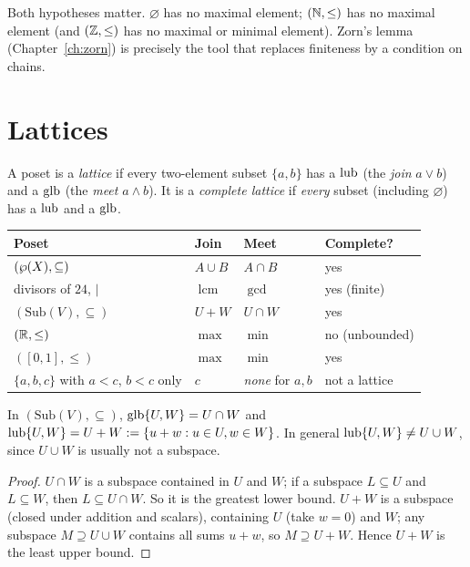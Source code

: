 \begin{remark}
	Both hypotheses matter. $\varnothing$ has no maximal element; $(\mathbb{N},\le)$ has no maximal element (and $(\mathbb{Z},\le)$ has no maximal or minimal element). Zorn's lemma (Chapter~\ref{ch:zorn}) is precisely the tool that replaces finiteness by a condition on chains.
\end{remark}

\section{Lattices}

\begin{definition}[Lattice]
	A poset is a \emph{lattice} if every two-element subset $\{a,b\}$ has a $\operatorname{lub}$ (the \emph{join} $a\vee b$) and a $\operatorname{glb}$ (the \emph{meet} $a\wedge b$). It is a \emph{complete lattice} if \emph{every} subset (including $\varnothing$) has a $\operatorname{lub}$ and a $\operatorname{glb}$.
\end{definition}

\begin{center}
	\begin{tabular}{@{}p{4.6cm}p{2.9cm}p{2.9cm}p{3.6cm}@{}}
		\toprule
		\textbf{Poset} & \textbf{Join} & \textbf{Meet} & \textbf{Complete?}\\
		\midrule
		$(\wp(X),\subseteq)$ & $A\cup B$ & $A\cap B$ & yes\\
		divisors of $24$, $\mid$ & $\operatorname{lcm}$ & $\gcd$ & yes (finite)\\
		$(\mathrm{Sub}(V),\subseteq)$ & $U+W$ & $U\cap W$ & yes\\
		$(\mathbb{R},\le)$ & $\max$ & $\min$ & no (unbounded)\\
		$([0,1],\le)$ & $\max$ & $\min$ & yes\\
		$\{a,b,c\}$ with $a<c$, $b<c$ only & $c$ & \emph{none} for $a,b$ & not a lattice\\
		\bottomrule
	\end{tabular}
\end{center}

\begin{proposition}[Subspaces]\label{prop:subspaces}
	In $(\mathrm{Sub}(V),\subseteq)$, $\operatorname{glb}\{U,W\}=U\cap W$ and $\operatorname{lub}\{U,W\}=U+W:=\{u+w:u\in U,w\in W\}$. In general $\operatorname{lub}\{U,W\}\neq U\cup W$, since $U\cup W$ is usually not a subspace.
\end{proposition}
\begin{proof}
	$U\cap W$ is a subspace contained in $U$ and $W$; if a subspace $L\subseteq U$ and $L\subseteq W$, then $L\subseteq U\cap W$. So it is the greatest lower bound. $U+W$ is a subspace (closed under addition and scalars), containing $U$ (take $w=0$) and $W$; any subspace $M\supseteq U\cup W$ contains all sums $u+w$, so $M\supseteq U+W$. Hence $U+W$ is the least upper bound.
\end{proof}


